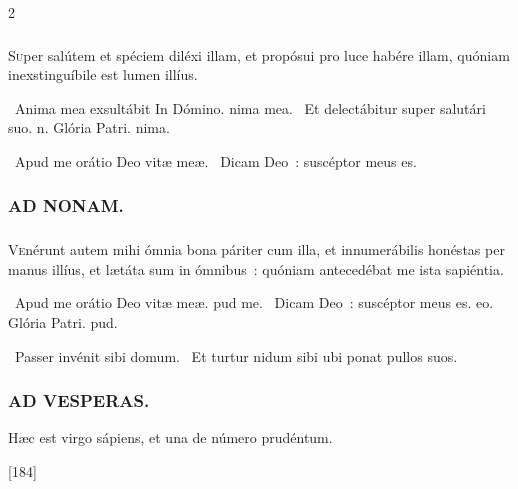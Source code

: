 \documentclass[9pt,twoside]{extarticle}
\begin{document}
\begin{multicols}{2}
{{{\subsubsection*{}
\lettrine{S}uper salútem et spéciem diléxi illam, et propósui pro luce habére illam, quóniam inexstinguíbile est lumen illíus.

\begin{tightlist}{}
\item {}~Anima mea exsultábit \textred{*} In Dómino. nima mea. ~Et delectábitur super salutári suo. n. Glória Patri. nima.
\item {}~Apud me orátio Deo vitæ meæ. ~Dicam Deo~: suscéptor meus es.
\end{tightlist}

\subsubsection*{\center \textsc{AD NONAM.}}
\subsubsection*{}
\lettrine{V}enérunt autem mihi ómnia bona páriter cum illa, et innumerábilis honéstas per manus illíus, et lætáta sum in ómnibus~: quóniam antecedébat me ista sapiéntia.

\begin{tightlist}{}
\item {}~Apud me orátio \textred{*} Deo vitæ meæ. pud me. ~Dicam Deo~: suscéptor meus es. eo. Glória Patri. pud.
\item {}~Passer invénit sibi domum. ~Et turtur nidum sibi ubi ponat pullos suos.
\end{tightlist}

\subsubsection*{\center \textsc{AD VESPERAS.}}
\begin{tightlist}{}
\item {} Hæc est virgo sápiens, et una de número prudéntum.
\item {} [184]
\end{tightlist}

}}}
\end{multicols}
\end{document}
